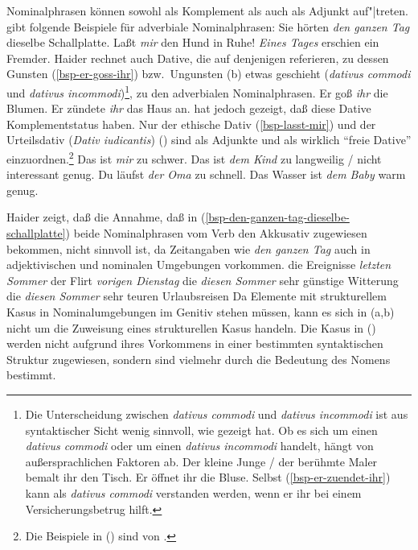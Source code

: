 Nominalphrasen können sowohl als Komplement als auch als Adjunkt
auf"|treten. \citet*{Haider85b} gibt folgende 
Beispiele für adverbiale Nominalphrasen:
\eal
\ex Sie hörten \emph{den ganzen Tag} dieselbe Schallplatte.\label{bsp-den-ganzen-tag-dieselbe-schallplatte}
\ex Laßt \emph{mir} den Hund in Ruhe!\label{bsp-lasst-mir}
\ex \emph{Eines Tages} erschien ein Fremder.
\zl
Haider rechnet auch Dative, die auf denjenigen referieren, zu dessen Gunsten (\ref{bsp-er-goss-ihr})
bzw.\ Ungunsten (b) etwas geschieht (\textit{dativus commodi\/} und \textit{dativus incommodi\/})\footnote{\label{fn-dativ-commodi}%
        Die Unterscheidung zwischen \textit{dativus commodi\/} und \textit{dativus incommodi\/}
        ist aus syntaktischer Sicht wenig sinnvoll, wie \citet*[]{Wegener85b}
        gezeigt hat.
        Ob es sich um einen \textit{dativus commodi\/} oder um einen \textit{dativus incommodi\/} handelt,
        hängt von außersprachlichen Faktoren ab.
        \eal
        \ex Der kleine Junge / der berühmte Maler bemalt ihr den Tisch.
        \ex Er öffnet ihr die Bluse.
        \zl
        Selbst (\ref{bsp-er-zuendet-ihr}) kann als \textit{dativus commodi\/} verstanden werden, wenn
        er ihr bei einem Versicherungsbetrug hilft.%
}, zu den adverbialen Nominalphrasen.
\eal
\ex Er goß \emph{ihr} die Blumen.\label{bsp-er-goss-ihr}
\ex Er zündete \emph{ihr} das Haus an.\label{bsp-er-zuendet-ihr}
\zl
\citet*{Wegener85b} hat jedoch gezeigt, daß diese Dative Komplementstatus haben.
Nur der ethische Dativ (\ref{bsp-lasst-mir}) und der Urteilsdativ (\textit{Dativ iudicantis}) ()
sind als Adjunkte und als wirklich "`freie Dative"' einzuordnen.\footnote{
        Die Beispiele in () sind von \citet*[]{Wegener85b}.
}
\eal
\ex Das ist \emph{mir} zu schwer.
\ex Das ist \emph{dem Kind} zu langweilig / nicht interessant genug.
\ex Du läufst \emph{der Oma} zu schnell.
\ex Das Wasser ist \emph{dem Baby} warm genug.
\zl

\noindent
Haider zeigt, daß die Annahme, daß in (\ref{bsp-den-ganzen-tag-dieselbe-schallplatte}) beide
Nominalphrasen vom Verb den Akkusativ zugewiesen bekommen,
nicht sinnvoll ist, da Zeitangaben wie \emph{den ganzen Tag} auch in adjektivischen und
nominalen Umgebungen vorkommen.
\eal
\ex die Ereignisse \emph{letzten Sommer}
\ex der Flirt \emph{vorigen Dienstag}
\ex die \emph{diesen Sommer} sehr günstige Witterung
\ex die \emph{diesen Sommer} sehr teuren Urlaubsreisen
\zl
Da Elemente mit strukturellem Kasus in Nominalumgebungen
im Genitiv stehen müssen, kann es sich in (a,b)
nicht um die Zuweisung eines strukturellen Kasus handeln.
%
Die Kasus in () werden nicht aufgrund ihres Vorkommens in einer bestimmten
syntaktischen Struktur zugewiesen, sondern sind vielmehr durch die Bedeutung des Nomens bestimmt.

